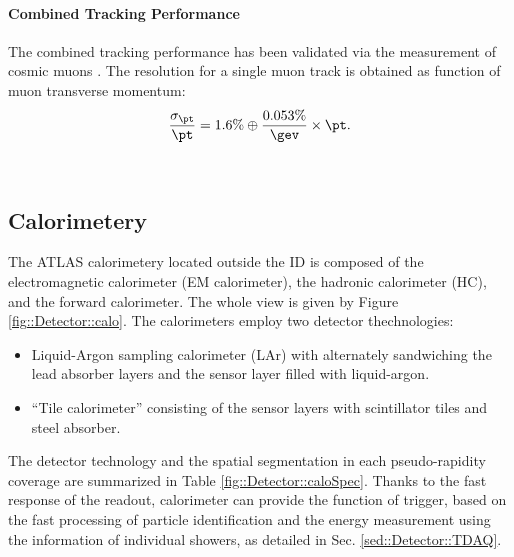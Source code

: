 \paragraph{Combined Tracking Performance}
The combined tracking performance has been validated via the measurement of cosmic muons \cite{ATLAScosmicPerf}. 
The resolution for a single muon track is obtained as function of muon transverse momentum:  
\begin{align}
\frac{\sigma_{\pt}}{\pt} = 1.6\% \oplus \frac{0.053\%}{\gev}\times \pt.  \label{eq::Detector::perf_ID}
\end{align}

\mbox{} \\


\subsection{Calorimetery}
The ATLAS calorimetery located outside the ID is composed of the electromagnetic calorimeter (EM calorimeter), the hadronic calorimeter (HC), and the forward calorimeter. 
The whole view is given by Figure \ref{fig::Detector::calo}.
The calorimeters employ two detector thechnologies:
\begin{itemize}
\item Liquid-Argon sampling calorimeter (LAr) with alternately sandwiching the lead absorber layers and the sensor layer filled with liquid-argon.
\item ``Tile calorimeter'' consisting of the sensor layers with scintillator tiles and steel absorber.
\end{itemize}
The detector technology and the spatial segmentation in each pseudo-rapidity coverage are summarized in Table \ref{fig::Detector::caloSpec}. 
Thanks to the fast response of the readout, calorimeter can provide the function of trigger, based on the fast processing of particle identification and the energy measurement using the information of individual showers, as detailed in Sec. \ref{sed::Detector::TDAQ}. \\

